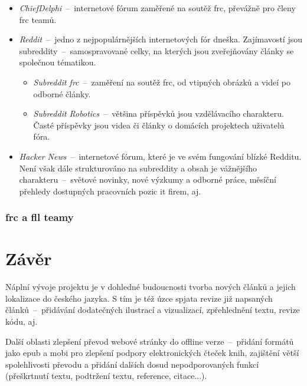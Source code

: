 \documentclass[a4paper, 12pt]{article}
\begin{document}
  {\parskip=0pt
  \begin{itemize}[topsep=\itemsep]
    \item \emph{ChiefDelphi}~--~internetové fórum zaměřené na soutěž \gls{frc}, převážně pro členy \gls{frc} teamů.
    \item \emph{Reddit}~--~jedno z nejpopulárnějších internetových fór dneška. Zajímavostí jsou subreddity~--~samospravované celky, na kterých jsou zveřejňovány články se společnou tématikou.
    \begin{itemize}[topsep=0pt]
      \item \emph{Subreddit \gls{frc}}~--~zaměření na soutěž \gls{frc}, od vtipných obrázků a videí po odborné články.
      \item \emph{Subreddit Robotics}~--~většina příspěvků jsou vzdělávacího charakteru. Časté příspěvky jsou videa či články o domácích projektech uživatelů fóra.
    \end{itemize}
    \item \emph{Hacker News}~--~internetové fórum, které je ve svém fungování blízké Redditu. Není však dále strukturováno na subreddity a obsah je vážnějšího charakteru~--~světové novinky, nové výzkumy a odborné práce, měsíční přehledy dostupných pracovních pozic \gls{it} firem, aj.
  \end{itemize}}


  \subsubsection{\acrshort{frc} a \acrshort{fll} teamy}

  \newpage

  \section{Závěr}
  Náplní vývoje projektu je v dohledné budoucnosti tvorba nových článků a jejich lokalizace do českého jazyka. S tím je též úzce spjata revize již napsaných článků~--~přidávání dodatečných ilustrací a vizualizací, zpřehlednění textu, revize kódu, aj.

  Další oblasti zlepšení převod webové stránky do offline verze~--~přidání formátů jako \gls{epub} a \gls{mobi} pro zlepšení podpory elektronických čteček knih, zajištění větší spolehlivosti převodu a přidání dalších dosud nepodporovaných funkcí (přeškrtnutí textu, podtržení textu, reference, citace...).

\end{document}
